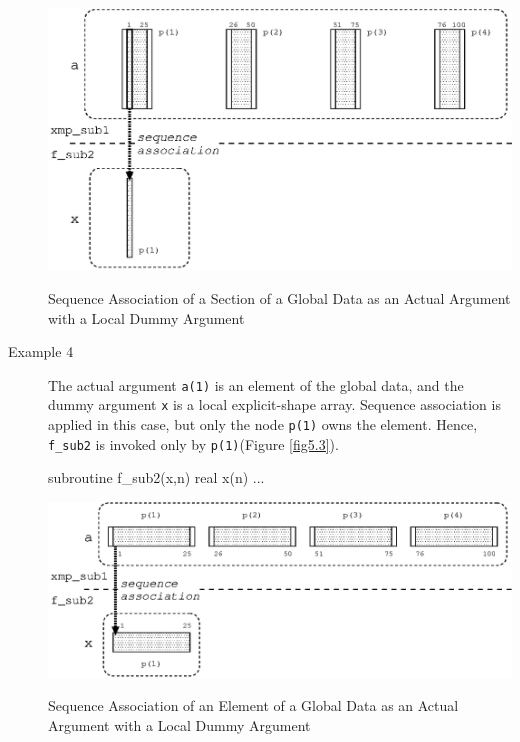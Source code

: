 \begin{description}
\begin{myfigure}
 \includegraphics[scale=0.7]{figs/fig5.25.eps}
 \caption{Sequence Association of a Section of a Global Data as an
 Actual Argument with a Local Dummy Argument}
 \label{fig5.25}
\end{myfigure}

\item[Example 4]

	   The actual argument {\tt a(1)} is an element of the global
	   data, and the dummy argument {\tt x} is a local
	   explicit-shape array. Sequence association is applied 
	   in this case, but only the node {\tt p(1)} owns the element.
	   Hence, {\tt f\_sub2} is invoked only by {\tt p(1)}(Figure
	   \ref{fig5.3}).

%
\begin{Fexample}
      subroutine f_sub2(x,n)
      real x(n)
      ...
\end{Fexample}

\begin{myfigure}
 \includegraphics[scale=0.7]{figs/fig5.3.eps}
 \caption{Sequence Association of an Element of a Global Data as an
 Actual Argument with a Local Dummy Argument}
 \label{fig5.3}
\end{myfigure}


\end{description}
